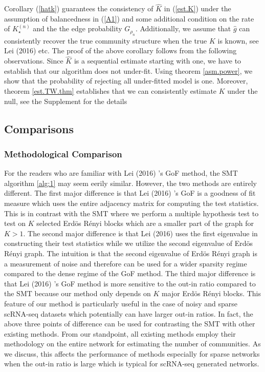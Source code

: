 \documentclass[11pt]{article}
\begin{document}
Corollary (\ref{hatk}) guarantees the consistency of $\hat{K}$ in (\ref{est.K}) under the assumption of balancedness in (\ref{A1}) and some additional condition on the rate of $K_{\star}^{(n)}$ and the the edge probability $G_{\rho_n}$. Additionally, we assume that $\hat{g}$ can consistently recover the true community structure when the true $K$ is known, see Lei (2016) \cite{lei16} etc. The proof of the above corollary follows from the following observations. Since $\hat{K}$ is a sequential estimate starting with one, we have to establish that our algorithm does not under-fit. Using theorem \ref{asm.power}, we show that the probability of rejecting all under-fitted model is one. Moreover, theorem \ref{est.TW.thm} establishes that we can consistently estimate $K$ under the null, see the Supplement for the details


\subsection{Comparisons}
\subsubsection{Methodological Comparison}
For the readers who are familiar with Lei (2016) \cite{lei16}'s GoF method, the SMT algorithm \ref{alg:1} may seem eerily similar. However, the two methods are entirely different. The first major difference is that Lei (2016) \cite{lei16}'s GoF is a goodness of fit measure which uses the entire adjacency matrix for computing the test statistics. This is in contrast with the SMT where we perform a multiple hypothesis test to test on $K$ selected Erd\"{o}s R\'{e}nyi blocks which are a smaller part of the graph for $K > 1$. The second major difference is that Lei (2016) \cite{lei16} uses the first eigenvalue in constructing their test statistics while we utilize the second eigenvalue of Erd\"{o}s R\'{e}nyi graph. The intuition is that the second eigenvalue of Erd\"{o}s R\'{e}nyi graph is a measurement of noise and therefore can be used for a wider sparsity regime compared to the dense regime of the GoF method. The third major difference is that Lei (2016) \cite{lei16}'s GoF method is more sensitive to the out-in ratio compared to the SMT because our method only depends on $K$ major Erd\"{o}s R\'{e}nyi blocks. This feature of our method is particularly useful in the case of noisy and sparse scRNA-seq datasets which potentially can have larger out-in ratios. In fact, the above three points of difference can be used for contrasting the SMT with other existing methods. From our standpoint, all existing methods employ their methodology on the entire network for estimating the number of communities. As we discuss, this affects the performance of methods especially for sparse networks when the out-in ratio is large which is typical for scRNA-seq generated networks.
\end{document}
